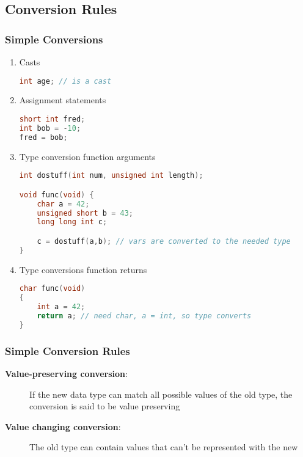 \documentclass[11pt,a4paper]{article}
\begin{document}
\subsection{Conversion Rules}

\subsubsection{Simple Conversions}

\begin{enumerate}
    \item Casts
    \begin{lstlisting}[language=C]
int age; // is a cast
    \end{lstlisting}
    
    \item Assignment statements
    \begin{lstlisting}[language=C]
short int fred;
int bob = -10;
fred = bob;
    \end{lstlisting}
    
    \item Type conversion function arguments
    \begin{lstlisting}[language=C]
int dostuff(int num, unsigned int length);

void func(void) {
    char a = 42;
    unsigned short b = 43;
    long long int c;

    c = dostuff(a,b); // vars are converted to the needed type
}
    \end{lstlisting}
    
    \item Type conversions function returns
    \begin{lstlisting}[language=C]
char func(void) 
{
    int a = 42;
    return a; // need char, a = int, so type converts
}
    \end{lstlisting}
\end{enumerate}

\subsubsection{Simple Conversion Rules}

\begin{description}
    \item[\textbf{Value-preserving conversion}:] If the new data type can match all possible values of the old type, the conversion is said to be value preserving
    
    \item[\textbf{Value changing conversion}:] The old type can contain values that can't be represented with the new
\end{description}
\end{document}
